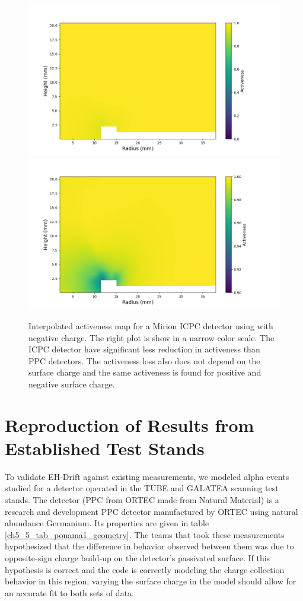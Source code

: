 \begin{figure}%
\centering
\includegraphics[trim={1.5cm 0cm 3.3cm 1cm},clip,width=0.49\linewidth]{ch5/figs/activeness_map_cubic_sc=-0.3_V07647A_5000_linear_full.png}
\includegraphics[trim={1.5cm 0cm 3.3cm 1cm},clip,width=0.49\linewidth]{ch5/figs/activeness_map_cubic_sc=-0.3_V07647A_5000_linear.png}

\caption{Interpolated activeness map for a Mirion ICPC detector using \ehd with negative charge. The right plot is show in a narrow color scale. The ICPC detector have significant less reduction in activeness than PPC detectors. The activeness loss also does not depend on the surface charge and the same activeness is found for positive and negative surface charge.}
\label{ch5_fig_interpolated_icpc_activeness_map}
\end{figure}


\section{\label{res:1} Reproduction of Results from Established Test Stands}
To validate EH-Drift against existing measurements, we modeled alpha events studied for a detector operated in the TUBE \cite{TUBE_paper} and GALATEA \cite{galatea_paper} scanning test stands. The {\ponama} detector (PPC from ORTEC made from Natural Material) is a research and development PPC detector manufactured by ORTEC using natural abundance Germanium. Its properties are given in table \ref{ch5_5_tab_ponama1_geometry}. The teams that took these measurements hypothesized that the difference in behavior observed between them was due to opposite-sign charge build-up on the detector's passivated surface. If this hypothesis is correct and the {\ehd} code is correctly modeling the charge collection behavior in this region, varying the surface charge in the model should allow for an accurate fit to both sets of data.

